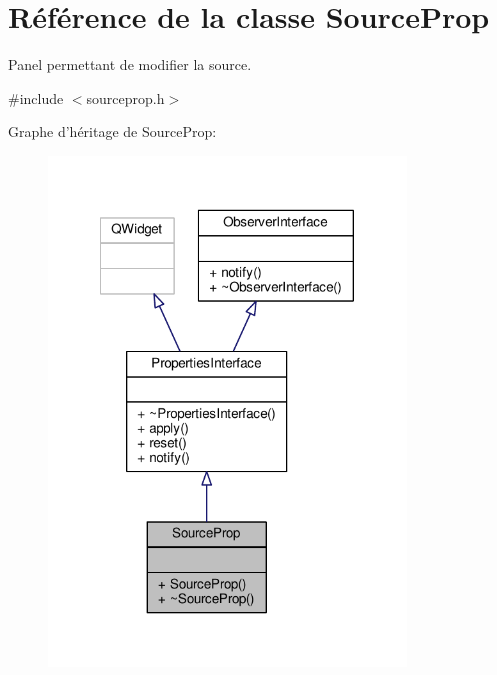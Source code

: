 \hypertarget{classSourceProp}{\section{Référence de la classe Source\+Prop}
\label{classSourceProp}
}


Panel permettant de modifier la source.  




{\ttfamily \#include $<$sourceprop.\+h$>$}



Graphe d'héritage de Source\+Prop\+:
\nopagebreak
\begin{figure}[H]
\begin{center}
\leavevmode
\includegraphics[width=269pt]{d6/da2/classSourceProp__inherit__graph}
\end{center}
\end{figure}


